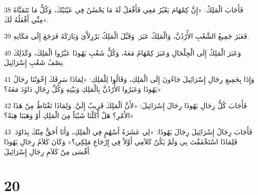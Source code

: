 \par 38 فَأَجَابَ الْمَلِكُ: «إِنَّ كِمْهَامَ يَعْبُرُ مَعِي فَأَفْعَلُ لَهُ مَا يَحْسُنُ فِي عَيْنَيْكَ، وَكُلُّ مَا تَتَمَنَّاهُ مِنِّي أَفْعَلُهُ لَكَ».
\par 39 فَعَبَرَ جَمِيعُ الشَّعْبِ الأُرْدُنَّ، وَالْمَلِكُ عَبَرَ. وَقَبَّلَ الْمَلِكُ بَرْزِلاَّيَ وَبَارَكَهُ فَرَجَعَ إِلَى مَكَانِهِ.
\par 40 وَعَبَرَ الْمَلِكُ إِلَى الْجِلْجَالِ وَعَبَرَ كِمْهَامُ مَعَهُ، وَكُلُّ شَعْبِ يَهُوذَا عَبَّرُوا الْمَلِكَ، وَكَذَلِكَ نِصْفُ شَعْبِ إِسْرَائِيلَ.
\par 41 وَإِذَا بِجَمِيعِ رِجَالِ إِسْرَائِيلَ جَاءُونَ إِلَى الْمَلِكِ، وَقَالُوا لِلْمَلِكِ: «لِمَاذَا سَرِقَكَ إِخْوَتُنَا رِجَالُ يَهُوذَا وَعَبَرُوا الأُرْدُنَّ بِالْمَلِكِ وَبَيْتِهِ وَكُلِّ رِجَالِ دَاوُدَ مَعَهُ؟»
\par 42 فَأَجَابَ كُلُّ رِجَالِ يَهُوذَا رِجَالَ إِسْرَائِيلَ: «لأَنَّ الْمَلِكَ قَرِيبٌ إِلَيَّ. وَلِمَاذَا تَغْتَاظُ مِنْ هَذَا الأَمْرِ؟ هَلْ أَكَلْنَا شَيْئاً مِنَ الْمَلِكِ أَوْ وَهَبَنَا هِبَةً؟»
\par 43 فَأَجَابَ رِجَالُ إِسْرَائِيلَ رِجَالَ يَهُوذَا: «لِي عَشَرَةُ أَسْهُمٍ فِي الْمَلِكِ، وَأَنَا أَحَقُّ مِنْكَ بِدَاوُدَ. فَلِمَاذَا اسْتَخْفَفْتَ بِي وَلَمْ يَكُنْ كَلاَمِي أَوَّلاً فِي إِرْجَاعِ مَلِكِي؟» وَكَانَ كَلاَمُ رِجَالِ يَهُوذَا أَقْسَى مِنْ كَلاَمِ رِجَالِ إِسْرَائِيلَ.

\chapter{20}

